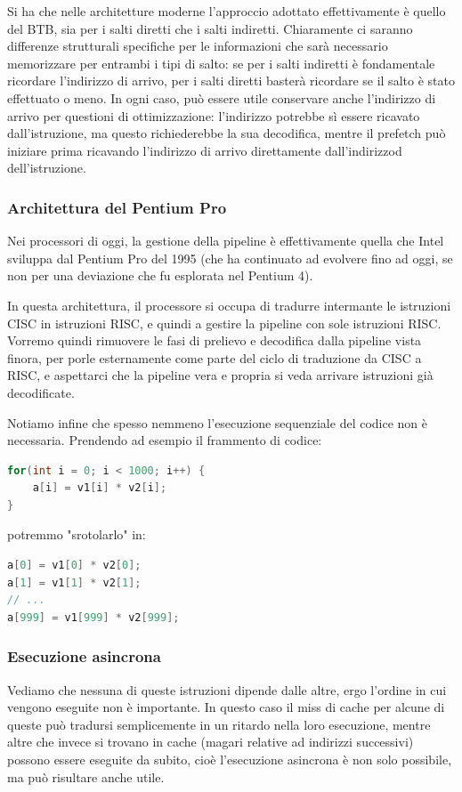 \documentclass[a4paper,11pt]{article}
\begin{document}
\begin{itemize}
\begin{itemize}
Si ha che nelle architetture moderne l'approccio adottato effettivamente è quello del BTB, sia per i salti diretti che i salti indiretti.
Chiaramente ci saranno differenze strutturali specifiche per le informazioni che sarà necessario memorizzare per entrambi i tipi di salto: se per i salti indiretti è fondamentale ricordare l'indirizzo di arrivo, per i salti diretti basterà ricordare se il salto è stato effettuato o meno.
In ogni caso, può essere utile conservare anche l'indirizzo di arrivo per questioni di ottimizzazione: l'indirizzo potrebbe sì essere ricavato dall'istruzione, ma questo richiederebbe la sua decodifica, mentre il prefetch può iniziare prima ricavando l'indirizzo di arrivo direttamente dall'indirizzod dell'istruzione.
		\end{itemize}

\end{itemize}

\subsubsection{Architettura del Pentium Pro}
Nei processori di oggi, la gestione della pipeline è effettivamente quella che Intel sviluppa dal Pentium Pro del 1995 (che ha continuato ad evolvere fino ad oggi, se non per una deviazione che fu esplorata nel Pentium 4).

In questa architettura, il processore si occupa di tradurre intermante le istruzioni CISC in istruzioni RISC, e quindi a gestire la pipeline con sole istruzioni RISC.
Vorremo quindi rimuovere le fasi di prelievo e decodifica dalla pipeline vista finora, per porle esternamente come parte del ciclo di traduzione da CISC a RISC, e aspettarci che la pipeline vera e propria si veda arrivare istruzioni già decodificate. 

\par\medskip

Notiamo infine che spesso nemmeno l'esecuzione sequenziale del codice non è necessaria.
Prendendo ad esempio il frammento di codice:
\begin{lstlisting}[language=C++, style=codestyle]	
for(int i = 0; i < 1000; i++) {
	a[i] = v1[i] * v2[i];
}
\end{lstlisting}
potremmo "srotolarlo" in:
\begin{lstlisting}[language=C++, style=codestyle]	
a[0] = v1[0] * v2[0];
a[1] = v1[1] * v2[1];
// ...
a[999] = v1[999] * v2[999];
\end{lstlisting}

\subsubsection{Esecuzione asincrona}
Vediamo che nessuna di queste istruzioni dipende dalle altre, ergo l'ordine in cui vengono eseguite non è importante.
In questo caso il miss di cache per alcune di queste può tradursi semplicemente in un ritardo nella loro esecuzione, mentre altre che invece si trovano in cache (magari relative ad indirizzi successivi) possono essere eseguite da subito, cioè l'esecuzione asincrona è non solo possibile, ma può risultare anche utile.
\end{document}
